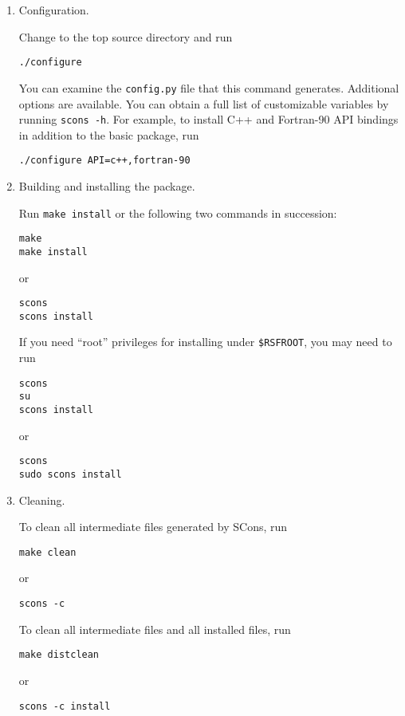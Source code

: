 \begin{enumerate}

\item Configuration.

Change to the top  source directory and run
\begin{verbatim}
./configure
\end{verbatim}

You can examine the \texttt{config.py} file that this command
generates.  Additional options are available. You can obtain a full
list of customizable variables by running \texttt{scons -h}. For
example, to install C++ and Fortran-90 API bindings in addition to the
basic package, run
\begin{verbatim}
./configure API=c++,fortran-90 
\end{verbatim}

\item Building and installing the package.

Run \texttt{make install} or the following two commands in succession: 
\begin{verbatim}
make
make install
\end{verbatim}
or
\begin{verbatim}
scons
scons install
\end{verbatim}

If you need ``root'' privileges for installing under \texttt{\$RSFROOT}, you may need to run
\begin{verbatim}
scons
su
scons install
\end{verbatim}
or
\begin{verbatim}
scons
sudo scons install
\end{verbatim}

\item Cleaning.

To clean all intermediate files generated by SCons, run
\begin{verbatim}
make clean
\end{verbatim}
or
\begin{verbatim}
scons -c
\end{verbatim}

To clean all intermediate files and all installed files, run
\begin{verbatim}
make distclean
\end{verbatim}
or
\begin{verbatim}
scons -c install
\end{verbatim}

\end{enumerate}

